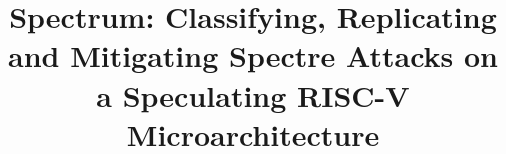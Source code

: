 \documentclass[conference]{IEEEtran}
\begin{document}

\title{Spectrum: Classifying, Replicating and Mitigating Spectre Attacks on a Speculating RISC-V Microarchitecture}


\author{
 \\
\and
{}
 \\
\and
{}
 \\
\and
{}
 \\
}

\maketitle





\end{document}
